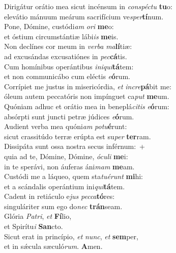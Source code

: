 \evenverse Dirigátur orátio mea sicut incénsum in \textit{con}\textit{spé}\textit{ctu} \textbf{tu}o:~\*\\
\evenverse elevátio mánuum meárum sacrifícium ve\textit{sper}\textbf{tí}num.\\
\oddverse Pone, Dómine, custódi\textit{am} \textit{o}\textit{ri} \textbf{me}o:~\*\\
\oddverse et óstium circumstántiæ lábi\textit{is} \textbf{me}is.\\
\evenverse Non declínes cor meum in \textit{ver}\textit{ba} \textit{ma}\textbf{lí}tiæ:~\*\\
\evenverse ad excusándas excusatiónes in \textit{pec}\textbf{cá}tis.\\
\oddverse Cum homínibus operántibus \textit{i}\textit{ni}\textit{qui}\textbf{tá}tem:~\*\\
\oddverse et non communicábo cum eléctis \textit{e}\textbf{ó}rum.\\
\evenverse Corrípiet me justus in misericórdia, \textit{et} \textit{in}\textit{cre}\textbf{pá}bit me:~\*\\
\evenverse óleum autem peccatóris non impínguet ca\textit{put} \textbf{me}um.\\
\oddverse Quóniam adhuc et orátio mea in beneplá\textit{ci}\textit{tis} \textit{e}\textbf{ó}rum:~\*\\
\oddverse absórpti sunt juncti petræ júdices \textit{e}\textbf{ó}rum.\\
\evenverse Audient verba mea quóni\textit{am} \textit{po}\textit{tu}\textbf{é}runt:~\*\\
\evenverse sicut crassitúdo terræ erúpta est su\textit{per} \textbf{ter}ram.\\
\oddverse Dissipáta sunt ossa nostra secus inférnum:~+\\
\oddverse  quia ad te, Dómine, Dómine, \textit{ó}\textit{cu}\textit{li} \textbf{me}i:~\*\\
\oddverse in te sperávi, non áuferas áni\textit{mam} \textbf{me}am.\\
\evenverse Custódi me a láqueo, quem sta\textit{tu}\textit{é}\textit{runt} \textbf{mi}hi:~\*\\
\evenverse et a scándalis operántium ini\textit{qui}\textbf{tá}tem.\\
\oddverse Cadent in retiáculo e\textit{jus} \textit{pec}\textit{ca}\textbf{tó}res:~\*\\
\oddverse singuláriter sum ego do\textit{nec} \textbf{trán}seam.\\
\evenverse Glória \textit{Pa}\textit{tri}, \textit{et} \textbf{Fí}lio,~\*\\
\evenverse et Spirítu\textit{i} \textbf{San}cto.\\
\oddverse Sicut erat in princípio, \textit{et} \textit{nunc}, \textit{et} \textbf{sem}per,~\*\\
\oddverse et in sǽcula sæculó\textit{rum}. \textbf{A}men.\\
